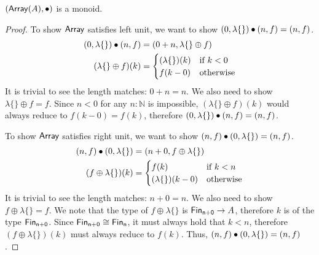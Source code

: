 %
\begin{toappendix}
    \begin{proposition}
        $(\operatorname{\mathsf{Array}}(A), \mathbin{\bullet})$ is a monoid.
    \end{proposition}

    \begin{proof}
        To show $\operatorname{\mathsf{Array}}$ satisfies left unit,
        we want to show $(0, \lambda\{\}) \mathbin{\bullet} (n, f) = (n, f)$.
        \begin{align*}
            (0 , \lambda\{\}) \mathbin{\bullet} (n , f) & = (0 + n , \lambda\{\} \oplus f)          \\
            (\lambda\{\} \oplus f)(k)       & = \begin{cases}
                                                    (\lambda\{\})(k) & \text{if}\ k < 0 \\
                                                    f(k - 0)         & \text{otherwise}
                                                \end{cases}
        \end{align*}
        It is trivial to see the length matches: $0 + n = n$. We also need to show $\lambda\{\} \oplus f = f$.
        Since $n < 0$ for any $n : \mathbb{N}$ is impossible, $(\lambda\{\} \oplus f)(k)$ would always reduce to
        $f(k - 0) = f(k)$, therefore $(0, \lambda\{\}) \mathbin{\bullet} (n, f) = (n, f)$.

        To show $\operatorname{\mathsf{Array}}$ satisfies right unit,
        we want to show $(n, f) \mathbin{\bullet} (0, \lambda\{\}) = (n, f)$.
        \begin{align*}
            (n, f) \mathbin{\bullet} (0 , \lambda\{\}) & = (n + 0, f \oplus \lambda\{\})               \\
            (f \oplus \lambda\{\})(k)      & = \begin{cases}
                                                   f(k)                 & \text{if}\ k < n \\
                                                   (\lambda\{\})(k - 0) & \text{otherwise}
                                               \end{cases}
        \end{align*}
        It is trivial to see the length matches: $n + 0 = n$. We also need to show $f \oplus \lambda\{\} = f$.
        We note that the type of $f \oplus \lambda\{\}$ is $\Fin[n + 0] \to A$, therefore $k$ is of the type $\Fin[n + 0]$.
        Since $\Fin[n+0] \cong \Fin[n]$, it must always hold that $k < n$, therefore $(f \oplus \lambda\{\})(k)$ must
        always reduce to $f(k)$. Thus, $(n, f) \mathbin{\bullet} (0, \lambda\{\}) = (n, f)$.


\end{proof}
\end{toappendix}
